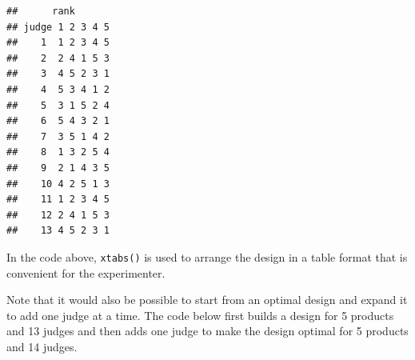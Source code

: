 \documentclass[
]{krantz}
\makeatletter
\newenvironment{Shaded}{\begin{snugshade}}{\end{snugshade}}
\newcommand{\AttributeTok}[1]{\textcolor[rgb]{0.61,0.61,0.61}{#1}}
\newcommand{\ConstantTok}[1]{\textcolor[rgb]{0,0,0}{#1}}
\newcommand{\DecValTok}[1]{\textcolor[rgb]{0.06,0.06,0.06}{#1}}
\newcommand{\FunctionTok}[1]{\textcolor[rgb]{0,0,0}{#1}}
\newcommand{\NormalTok}[1]{#1}
\newcommand{\OtherTok}[1]{\textcolor[rgb]{0.37,0.37,0.37}{#1}}
\newcommand{\SpecialCharTok}[1]{\textcolor[rgb]{0,0,0}{#1}}
\newenvironment{kframe}{%
\medskip{}
\setlength{\fboxsep}{.8em}
 \def\at@end@of@kframe{}%
 \ifinner\ifhmode%
  \def\at@end@of@kframe{\end{minipage}}%
  \begin{minipage}{\columnwidth}%
 \fi\fi%
 \def\FrameCommand##1{\hskip\@totalleftmargin \hskip-\fboxsep
 \colorbox{shadecolor}{##1}\hskip-\fboxsep
     \hskip-\linewidth \hskip-\@totalleftmargin \hskip\columnwidth}%
 \MakeFramed {\advance\hsize-\width
   \@totalleftmargin\z@ \linewidth\hsize
   \@setminipage}}%
 {\par\unskip\endMakeFramed%
 \at@end@of@kframe}
\renewenvironment{Shaded}{\begin{kframe}}{\end{kframe}}
\makeatother
\begin{document}
\begin{Shaded}
\end{Shaded}

\begin{verbatim}
##      rank
## judge 1 2 3 4 5
##    1  1 2 3 4 5
##    2  2 4 1 5 3
##    3  4 5 2 3 1
##    4  5 3 4 1 2
##    5  3 1 5 2 4
##    6  5 4 3 2 1
##    7  3 5 1 4 2
##    8  1 3 2 5 4
##    9  2 1 4 3 5
##    10 4 2 5 1 3
##    11 1 2 3 4 5
##    12 2 4 1 5 3
##    13 4 5 2 3 1
\end{verbatim}

In the code above, \texttt{xtabs()} is used to arrange the design in a table format that is convenient for the experimenter.

Note that it would also be possible to start from an optimal design and expand it to add one judge at a time. The code below first builds a design for 5 products and 13 judges and then adds one judge to make the design optimal for 5 products and 14 judges.
\end{document}
